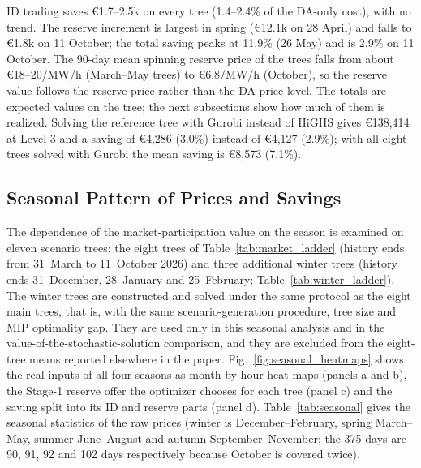 \documentclass[5p,times,twocolumn]{elsarticle}
\begin{document}
ID trading saves \euro 1.7--2.5k on every tree (1.4--2.4\% of the DA-only cost), with no trend. The reserve increment is largest in spring (\euro 12.1k on 28 April) and falls to \euro 1.8k on 11 October; the total saving peaks at 11.9\% (26 May) and is 2.9\% on 11 October. The 90-day mean spinning reserve price of the trees falls from about \euro 18--20/MW/h (March--May trees) to \euro 6.8/MW/h (October), so the reserve value follows the reserve price rather than the DA price level. The totals are expected values on the tree; the next subsections show how much of them is realized. Solving the reference tree with Gurobi instead of HiGHS gives \euro 138,414 at Level 3 and a saving of \euro 4,286 (3.0\%) instead of \euro 4,127 (2.9\%); with all eight trees solved with Gurobi the mean saving is \euro 8,573 (7.1\%).

\subsection{Seasonal Pattern of Prices and Savings }
\label{sec:seasonal}
The dependence of the market-participation value on the season is examined on eleven scenario trees: the eight trees of Table~\ref{tab:market_ladder} (history ends from 31~March to 11~October 2026) and three additional winter trees (history ends 31~December, 28~January and 25~February; Table~\ref{tab:winter_ladder}). The winter trees are constructed and solved under the same protocol as the eight main trees, that is, with the same scenario-generation procedure, tree size and MIP optimality gap. They are used only in this seasonal analysis and in the value-of-the-stochastic-solution comparison, and they are excluded from the eight-tree means reported elsewhere in the paper. Fig.~\ref{fig:seasonal_heatmaps} shows the real inputs of all four seasons as month-by-hour heat maps (panels a and b), the Stage-1 reserve offer the optimizer chooses for each tree (panel c) and the saving split into its ID and reserve parts (panel d). Table~\ref{tab:seasonal} gives the seasonal statistics of the raw prices (winter is December--February, spring March--May, summer June--August and autumn September--November; the 375 days are 90, 91, 92 and 102 days respectively because October is covered twice).
\end{document}
